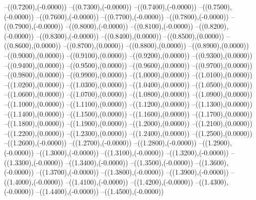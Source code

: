 {	--({\sx*(0.7200)},{\sy*(-0.0000)})
	--({\sx*(0.7300)},{\sy*(-0.0000)})
	--({\sx*(0.7400)},{\sy*(-0.0000)})
	--({\sx*(0.7500)},{\sy*(-0.0000)})
	--({\sx*(0.7600)},{\sy*(-0.0000)})
	--({\sx*(0.7700)},{\sy*(-0.0000)})
	--({\sx*(0.7800)},{\sy*(-0.0000)})
	--({\sx*(0.7900)},{\sy*(-0.0000)})
	--({\sx*(0.8000)},{\sy*(-0.0000)})
	--({\sx*(0.8100)},{\sy*(-0.0000)})
	--({\sx*(0.8200)},{\sy*(-0.0000)})
	--({\sx*(0.8300)},{\sy*(-0.0000)})
	--({\sx*(0.8400)},{\sy*(0.0000)})
	--({\sx*(0.8500)},{\sy*(0.0000)})
	--({\sx*(0.8600)},{\sy*(0.0000)})
	--({\sx*(0.8700)},{\sy*(0.0000)})
	--({\sx*(0.8800)},{\sy*(0.0000)})
	--({\sx*(0.8900)},{\sy*(0.0000)})
	--({\sx*(0.9000)},{\sy*(0.0000)})
	--({\sx*(0.9100)},{\sy*(0.0000)})
	--({\sx*(0.9200)},{\sy*(0.0000)})
	--({\sx*(0.9300)},{\sy*(0.0000)})
	--({\sx*(0.9400)},{\sy*(0.0000)})
	--({\sx*(0.9500)},{\sy*(0.0000)})
	--({\sx*(0.9600)},{\sy*(0.0000)})
	--({\sx*(0.9700)},{\sy*(0.0000)})
	--({\sx*(0.9800)},{\sy*(0.0000)})
	--({\sx*(0.9900)},{\sy*(0.0000)})
	--({\sx*(1.0000)},{\sy*(0.0000)})
	--({\sx*(1.0100)},{\sy*(0.0000)})
	--({\sx*(1.0200)},{\sy*(0.0000)})
	--({\sx*(1.0300)},{\sy*(0.0000)})
	--({\sx*(1.0400)},{\sy*(0.0000)})
	--({\sx*(1.0500)},{\sy*(0.0000)})
	--({\sx*(1.0600)},{\sy*(0.0000)})
	--({\sx*(1.0700)},{\sy*(0.0000)})
	--({\sx*(1.0800)},{\sy*(0.0000)})
	--({\sx*(1.0900)},{\sy*(0.0000)})
	--({\sx*(1.1000)},{\sy*(0.0000)})
	--({\sx*(1.1100)},{\sy*(0.0000)})
	--({\sx*(1.1200)},{\sy*(0.0000)})
	--({\sx*(1.1300)},{\sy*(0.0000)})
	--({\sx*(1.1400)},{\sy*(0.0000)})
	--({\sx*(1.1500)},{\sy*(0.0000)})
	--({\sx*(1.1600)},{\sy*(0.0000)})
	--({\sx*(1.1700)},{\sy*(0.0000)})
	--({\sx*(1.1800)},{\sy*(0.0000)})
	--({\sx*(1.1900)},{\sy*(0.0000)})
	--({\sx*(1.2000)},{\sy*(0.0000)})
	--({\sx*(1.2100)},{\sy*(0.0000)})
	--({\sx*(1.2200)},{\sy*(0.0000)})
	--({\sx*(1.2300)},{\sy*(0.0000)})
	--({\sx*(1.2400)},{\sy*(0.0000)})
	--({\sx*(1.2500)},{\sy*(0.0000)})
	--({\sx*(1.2600)},{\sy*(-0.0000)})
	--({\sx*(1.2700)},{\sy*(-0.0000)})
	--({\sx*(1.2800)},{\sy*(-0.0000)})
	--({\sx*(1.2900)},{\sy*(-0.0000)})
	--({\sx*(1.3000)},{\sy*(-0.0000)})
	--({\sx*(1.3100)},{\sy*(-0.0000)})
	--({\sx*(1.3200)},{\sy*(-0.0000)})
	--({\sx*(1.3300)},{\sy*(-0.0000)})
	--({\sx*(1.3400)},{\sy*(-0.0000)})
	--({\sx*(1.3500)},{\sy*(-0.0000)})
	--({\sx*(1.3600)},{\sy*(-0.0000)})
	--({\sx*(1.3700)},{\sy*(-0.0000)})
	--({\sx*(1.3800)},{\sy*(-0.0000)})
	--({\sx*(1.3900)},{\sy*(-0.0000)})
	--({\sx*(1.4000)},{\sy*(-0.0000)})
	--({\sx*(1.4100)},{\sy*(-0.0000)})
	--({\sx*(1.4200)},{\sy*(-0.0000)})
	--({\sx*(1.4300)},{\sy*(-0.0000)})
	--({\sx*(1.4400)},{\sy*(-0.0000)})
	--({\sx*(1.4500)},{\sy*(-0.0000)})
}
